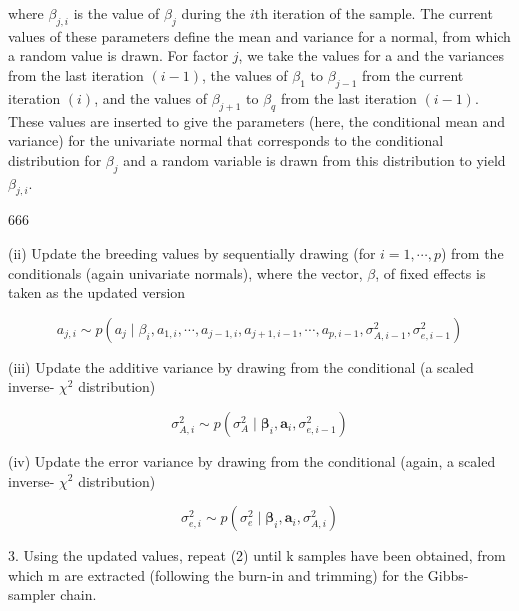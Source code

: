 \documentclass{article}
\begin{document}
where  $ \beta_{j,i} $ is the value of  $ \beta_j $ during the  $ i $th iteration of the sample. The current values of these parameters define the mean and variance for a normal, from which a random value is drawn. For factor  $ j $, we take the values for a and the variances from the last iteration  $ (i-1) $, the values of  $ \beta_1 $ to  $ \beta_{j-1} $ from the current iteration  $ (i) $, and the values of  $ \beta_{j+1} $ to  $ \beta_q $ from the last iteration  $ (i-1) $. These values are inserted to give the parameters (here, the conditional mean and variance) for the univariate normal that corresponds to the conditional distribution for  $ \beta_j $ and a random variable is drawn from this distribution to yield  $ \beta_{j,i} $.

666

(ii) Update the breeding values by sequentially drawing (for  $ i = 1, \cdots, p $) from the conditionals (again univariate normals), where the vector,  $ \beta $, of fixed effects is taken as the updated version

\begin{equation}
a_{j,i}\sim p(a_{j}\mid\beta_{i},a_{1,i},\cdots,a_{j-1,i},a_{j+1,i-1},\cdots,a_{p,i-1},\sigma_{A,i-1}^{2},\sigma_{e,i-1}^{2})
\end{equation}

(iii) Update the additive variance by drawing from the conditional (a scaled inverse- $ \chi^{2} $ distribution)

\begin{equation}
\sigma_{A,i}^{2}\sim p(\sigma_{A}^{2}\mid\boldsymbol{\beta}_{i},\mathbf{a}_{i},\sigma_{e,i-1}^{2})
\end{equation}

(iv) Update the error variance by drawing from the conditional (again, a scaled inverse- $ \chi^{2} $ distribution)

\begin{equation}
\sigma_{e,i}^{2}\sim p(\sigma_{e}^{2}\mid\boldsymbol{\beta}_{i},\mathbf{a}_{i},\sigma_{A,i}^{2})
\end{equation}

3. Using the updated values, repeat (2) until k samples have been obtained, from which m are extracted (following the burn-in and trimming) for the Gibbs-sampler chain.
\end{document}
